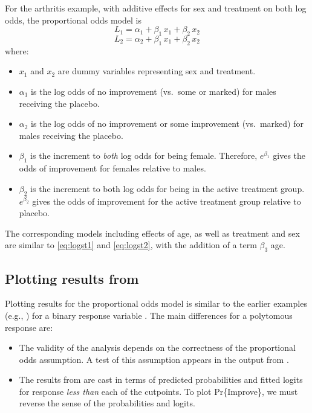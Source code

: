 For the arthritis example, with additive effects for sex and
treatment on both log odds, the proportional odds model is
\begin{equation} \label{eq:logst1}
  L_1 = \alpha _1  +
  \beta _1 \,  x_1  +
  \beta _2 \,  x_2
\end{equation}
\begin{equation} \label{eq:logst2}
  L_2 = \alpha _2  +
  \beta _1 \,  x_1  +
  \beta _2 \,  x_2
\end{equation}
where:
\begin{itemize}

\item \(x_1\) and \(x_2\) are dummy variables representing sex and
       treatment.

\item \(\alpha _1\) is the log odds of no improvement (vs.\  some or
       marked) for males receiving the placebo.

\item \(\alpha _2\) is the log odds of no improvement or some
       improvement (vs.\  marked) for males receiving the placebo.

\item \(\beta _1\) is the increment to \emph{both} log odds for being
       female.  Therefore, \(e^{ \beta _1 }\) gives the odds of
       improvement for females relative to males.

\item \(\beta _2\) is the increment to both log odds for being in the
       active treatment group.  \(e^{ \beta _2 }\) gives the odds of
       improvement for the active treatment group relative to
       placebo.

\end{itemize}

The corresponding models including effects of age, as well as
treatment and sex are similar to \eqref{eq:logst1} and \eqref{eq:logst2}, with the addition of
a term $\beta _3$  age.

\subsection{Plotting results from }

Plotting results for the proportional odds model is similar to the
earlier examples (e.g., )
for a binary response variable%
.  The main differences for a polytomous response are:

\begin{itemize}

\item The validity of the analysis depends on the correctness of the
       proportional odds assumption.  A test of this assumption
       appears in the output from .

\item The results from  are cast in terms of predicted
       probabilities and fitted logits for response \emph{less than}
       each of the cutpoints.  To plot Pr\{Improve\}, we must reverse
       the sense of the probabilities and logits.

\end{itemize}

